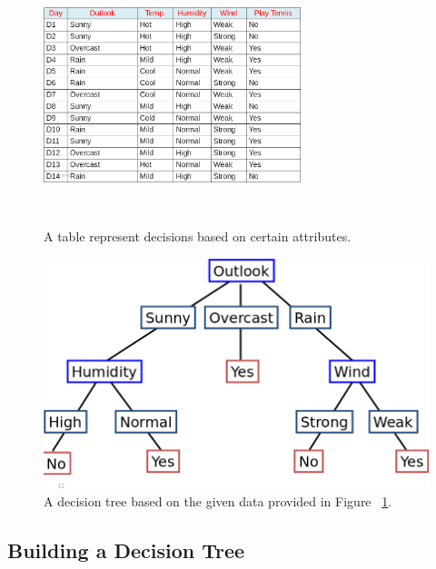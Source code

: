 \documentclass{beamer}
\begin{document}
\begin{frame}
    
    \begin{figure}[]
        \centering
        \includegraphics[width=75mm,height=75mm,keepaspectratio]{assets/images/Untitled.png}
        \caption{A table represent decisions based on certain attributes.}
        \label{fig:data_table}
    \end{figure}
\end{frame}


\begin{frame}
        
    \begin{figure}[]
        \centering
        \includegraphics[width=\textwidth,height=\textheight,keepaspectratio]{assets/images/tree.png}
        \caption{A decision tree based on the given data provided in Figure ~\ref{fig:data_table}. }
    \end{figure}
\end{frame}

\subsection{Building a Decision Tree}
\end{document}
